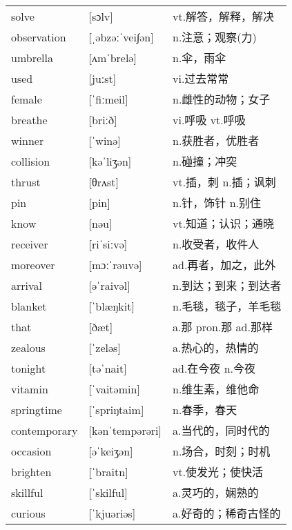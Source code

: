 \documentclass[a4paper]{article}
\begin{document}
\section{}
\begin{tabular}{l l l}

solve & [sɔlv] & vt.解答，解释，解决 \\
observation & [ˌəbzəːˈvei∫ən] & n.注意；观察(力) \\
umbrella & [ʌmˈbrelə] & n.伞，雨伞 \\
used & [juːst] & vi.过去常常 \\
female & [ˈfiːmeil] & n.雌性的动物；女子 \\
breathe & [briːð] & vi.呼吸 vt.呼吸 \\
winner & [ˈwinə] & n.获胜者，优胜者 \\
collision & [kəˈliʒən] & n.碰撞；冲突 \\
thrust & [θrʌst] & vt.插，刺 n.插；讽刺 \\
pin & [pin] & n.针，饰针 n.别住 \\
know & [nəu] & vt.知道；认识；通晓 \\
receiver & [riˈsiːvə] & n.收受者，收件人 \\
moreover & [mɔːˈrəuvə] & ad.再者，加之，此外 \\
arrival & [əˈraivəl] & n.到达；到来；到达者 \\
blanket & [ˈblæŋkit] & n.毛毯，毯子，羊毛毯 \\
that & [ðæt] & a.那 pron.那 ad.那样 \\
zealous & [ˈzeləs] & a.热心的，热情的 \\
tonight & [təˈnait] & ad.在今夜 n.今夜 \\
vitamin & [ˈvaitəmin] & n.维生素，维他命 \\
springtime & [ˈspriŋtaim] & n.春季，春天 \\
contemporary & [kənˈtempərəri] & a.当代的，同时代的 \\
occasion & [əˈkeiʒən] & n.场合，时刻；时机 \\
brighten & [ˈbraitn] & vt.使发光；使快活 \\
skillful & [ˈskilful] & a.灵巧的，娴熟的 \\
curious & [ˈkjuəriəs] & a.好奇的；稀奇古怪的 \\

\end{tabular}
\end{document}
